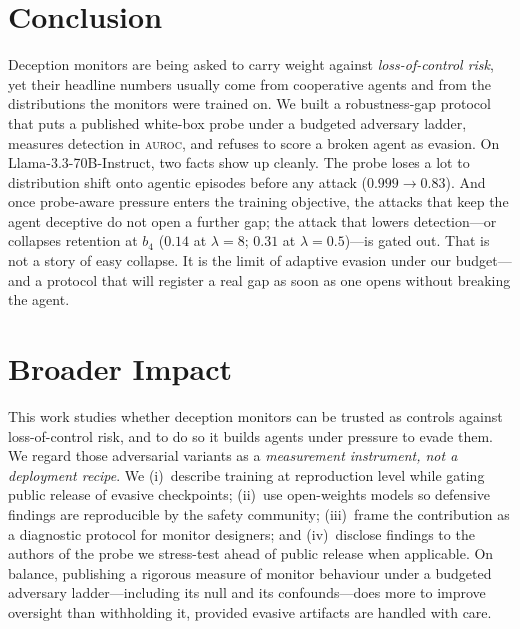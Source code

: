 \documentclass{article}
\newcommand{\auroc}{\textsc{auroc}\xspace}
\newcommand{\model}{Llama-3.3-70B-Instruct\xspace}
\begin{document}
\section{Conclusion}
\label{sec:conclusion}

Deception monitors are being asked to carry weight against
\emph{loss-of-control risk}, yet their headline numbers usually come from
cooperative agents and from the distributions the monitors were trained on.
We built a robustness-gap protocol that puts a published white-box probe
under a budgeted adversary ladder, measures detection in \auroc{}, and
refuses to score a broken agent as evasion. On \model{}, two facts show up
cleanly. The probe loses a lot to distribution shift onto agentic episodes
before any attack ($0.999\rightarrow0.83$). And once probe-aware pressure
enters the training objective, the attacks that keep the agent deceptive do
not open a further gap; the attack that lowers detection---or collapses
retention at $b_4$ ($0.14$ at $\lambda{=}8$; $0.31$ at $\lambda{=}0.5$)---is
gated out. That is not a story of easy collapse. It is the limit of
adaptive evasion under our budget---and a protocol that will register a real
gap as soon as one opens without breaking the agent.

\section*{Broader Impact}
\label{sec:impact}

This work studies whether deception monitors can be trusted as controls
against loss-of-control risk, and to do so it builds agents under pressure
to evade them. We regard those adversarial variants as a \emph{measurement
instrument, not a deployment recipe}. We (i)~describe training at
reproduction level while gating public release of evasive checkpoints;
(ii)~use open-weights models so defensive findings are reproducible by the
safety community; (iii)~frame the contribution as a diagnostic protocol for
monitor designers; and (iv)~disclose findings to the authors of the probe we
stress-test ahead of public release when applicable. On balance, publishing
a rigorous measure of monitor behaviour under a budgeted adversary
ladder---including its null and its confounds---does more to improve
oversight than withholding it, provided evasive artifacts are handled with
care.



\end{document}
